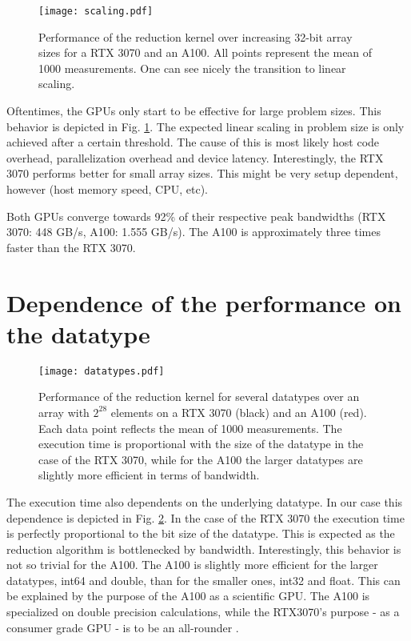 \begin{figure}
    \centering
    \texttt{[image: scaling.pdf]}
    \caption{
        Performance of the reduction kernel over increasing 32-bit array sizes for a RTX 3070 and an A100.
        All points represent the mean of 1000 measurements.
        One can see nicely the transition to linear scaling.
    } \label{fig_scaling}
\end{figure}

Oftentimes, the GPUs only start to be effective for large problem sizes.
This behavior is depicted in Fig. \ref{fig_scaling}.
The expected linear scaling in problem size is only achieved after a certain threshold.
The cause of this is most likely host code overhead, parallelization overhead and device latency.
Interestingly, the RTX 3070 performs better for small array sizes.
This might be very setup dependent, however (host memory speed, CPU, etc).

Both GPUs converge towards 92\% of their respective peak bandwidths (RTX 3070: 448 GB/s, A100: 1.555 GB/s).
The A100 is approximately three times faster than the RTX 3070.

\section{Dependence of the performance on the datatype}

\begin{figure}
    \centering
    \texttt{[image: datatypes.pdf]}
    \caption{
        Performance of the reduction kernel for several datatypes over an array with \( 2^{28} \) elements on a RTX 3070 (black) and an A100 (red).
        Each data point reflects the mean of 1000 measurements.
        The execution time is proportional with the size of the datatype in the case of the RTX 3070,
        while for the A100 the larger datatypes are slightly more efficient in terms of bandwidth.
    } \label{fig_datatypes}
\end{figure}

The execution time also dependents on the underlying datatype.
In our case this dependence is depicted in Fig. \ref{fig_datatypes}.
In the case of the RTX 3070 the execution time is perfectly proportional to the bit size of the datatype.
This is expected as the reduction algorithm is bottlenecked by bandwidth.
Interestingly, this behavior is not so trivial for the A100.
The A100 is slightly more efficient for the larger datatypes, int64 and double, than for the smaller ones, int32 and float.
This can be explained by the purpose of the A100 as a scientific GPU.
The A100 is specialized on double precision calculations, while the RTX3070's purpose - as a consumer grade GPU - is to be an all-rounder \cite{programming_guide}.

